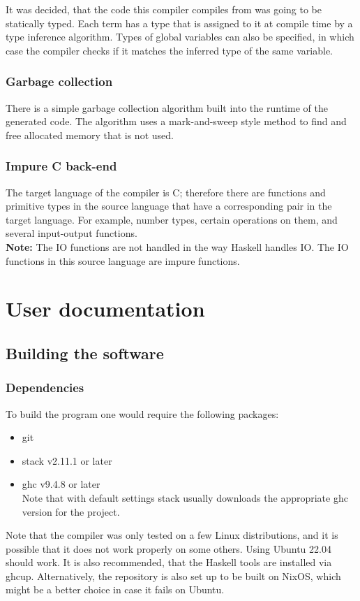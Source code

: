 \documentclass[12pt]{article}
\begin{document}
It was decided, that the code this compiler compiles from was going to be
statically typed. Each term has a type that is assigned to it at compile time by
a type inference algorithm. Types of global variables can also be specified, in
which case the compiler checks if it matches the inferred type of the same
variable.

\subsubsection{Garbage collection}

There is a simple garbage collection algorithm built into the runtime of the
generated code. The algorithm uses a mark-and-sweep style method to find and
free allocated memory that is not used.

\subsubsection{Impure C back-end}

The target language of the compiler is C; therefore there are functions and
primitive types in the source language that have a corresponding pair in the
target language. For example, number types, certain operations on them, and
several input-output functions. \\ \textbf{Note:} The IO functions are not handled in
the way Haskell handles IO. The IO functions in this source language are impure
functions.

\section{User documentation}

\subsection{Building the software}
\subsubsection{Dependencies}

To build the program one would require the following packages:
\begin{itemize}
    \item git
    \item stack v2.11.1 or later
    \item ghc v9.4.8 or later \\ Note that with default settings stack usually
        downloads the appropriate ghc version for the project.
\end{itemize}
Note that the compiler was only tested on a few Linux distributions, and it is
possible that it does not work properly on some others. Using Ubuntu 22.04
should work. It is also recommended, that the Haskell tools are installed via
ghcup. Alternatively, the repository is also set up to be built on NixOS, which
might be a better choice in case it fails on Ubuntu.
\end{document}
